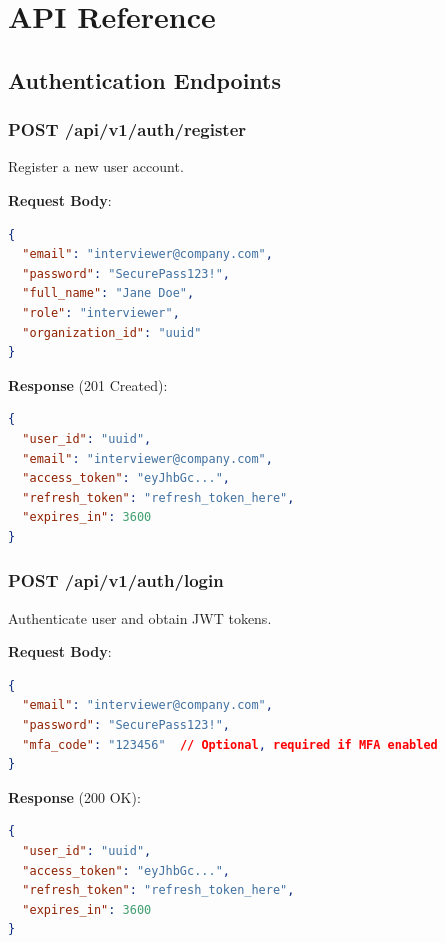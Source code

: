\documentclass[11pt,letterpaper]{article}
\begin{document}

\appendix

\section{API Reference}

\subsection{Authentication Endpoints}

\subsubsection{POST /api/v1/auth/register}

Register a new user account.

\textbf{Request Body}:
\begin{lstlisting}[language=json]
{
  "email": "interviewer@company.com",
  "password": "SecurePass123!",
  "full_name": "Jane Doe",
  "role": "interviewer",
  "organization_id": "uuid"
}
\end{lstlisting}

\textbf{Response} (201 Created):
\begin{lstlisting}[language=json]
{
  "user_id": "uuid",
  "email": "interviewer@company.com",
  "access_token": "eyJhbGc...",
  "refresh_token": "refresh_token_here",
  "expires_in": 3600
}
\end{lstlisting}

\subsubsection{POST /api/v1/auth/login}

Authenticate user and obtain JWT tokens.

\textbf{Request Body}:
\begin{lstlisting}[language=json]
{
  "email": "interviewer@company.com",
  "password": "SecurePass123!",
  "mfa_code": "123456"  // Optional, required if MFA enabled
}
\end{lstlisting}

\textbf{Response} (200 OK):
\begin{lstlisting}[language=json]
{
  "user_id": "uuid",
  "access_token": "eyJhbGc...",
  "refresh_token": "refresh_token_here",
  "expires_in": 3600
}
\end{lstlisting}
\end{document}
